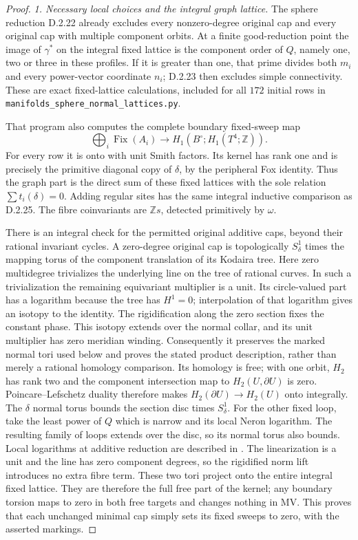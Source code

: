 \begin{proof}
\emph{1. Necessary local choices and the integral graph lattice.}
The sphere reduction D.2.22 already excludes every nonzero-degree
original cap and every original cap with multiple component orbits.
At a finite good-reduction point the image of $\gamma^*$ on the
integral fixed lattice is the component order of $Q$, namely one,
two or three in these profiles. If it is greater than one, that
prime divides both $m_i$ and every power-vector coordinate $n_i$;
D.2.23 then excludes simple connectivity. These are exact fixed-lattice
calculations, included for all $172$ initial rows in
\texttt{manifolds\_sphere\_normal\_lattices.py}.

That program also computes the complete boundary fixed-sweep map
\[
 \bigoplus_i\operatorname{Fix}(A_i)
       \longrightarrow H_1(B^\circ;H_1(T^4;\mathbb Z)).
\]
For every row it is onto with unit Smith factors. Its kernel has
rank one and is precisely the primitive diagonal copy of $\delta$,
by the peripheral Fox identity. Thus the graph part is the direct
sum of these fixed lattices with the sole relation
$\sum t_i(\delta)=0$. Adding regular sites has the same integral
inductive comparison as D.2.25. The fibre coinvariants are
$\mathbb Zs$, detected primitively by $\omega$.

There is an integral check for the permitted original additive
caps, beyond their rational invariant cycles. A zero-degree original
cap is topologically $S^1_\delta$ times the mapping torus of the
component translation of its Kodaira tree. Here zero multidegree
trivializes the underlying line on the tree of rational curves.
In such a trivialization the remaining equivariant multiplier is a
unit. Its circle-valued part has a logarithm because the tree has
$H^1=0$; interpolation of that logarithm gives an isotopy to the
identity. The rigidification along the zero section fixes the
constant phase. This isotopy extends over the normal collar, and
its unit multiplier has zero meridian winding. Consequently it
preserves the marked normal tori used below and proves the stated
product description, rather than merely a rational homology
comparison. Its homology is free;
with one orbit, $H_2$ has rank two and the component intersection
map to $H_2(U,\partial U)$ is zero. Poincare--Lefschetz duality
therefore makes $H_2(\partial U)\to H_2(U)$ onto integrally.
The $\delta$ normal torus bounds the section disc times $S^1_\delta$.
For the other fixed loop, take the least power of $Q$ which is
narrow and its local Neron logarithm. The resulting family of loops
extends over the disc, so its normal torus also bounds. Local
logarithms at additive reduction are described in
\cite[Section 2.4, equation (2.2)]{manUU21}.
The linearization is a unit and the line has zero component degrees,
so the rigidified norm lift introduces no extra fibre term.
These two tori project onto the entire integral fixed lattice.
They are therefore the full free part of the kernel; any boundary
torsion maps to zero in both free targets and changes nothing in
MV. This proves that each unchanged minimal cap simply sets its
fixed sweeps to zero, with the asserted markings.


\end{proof}
